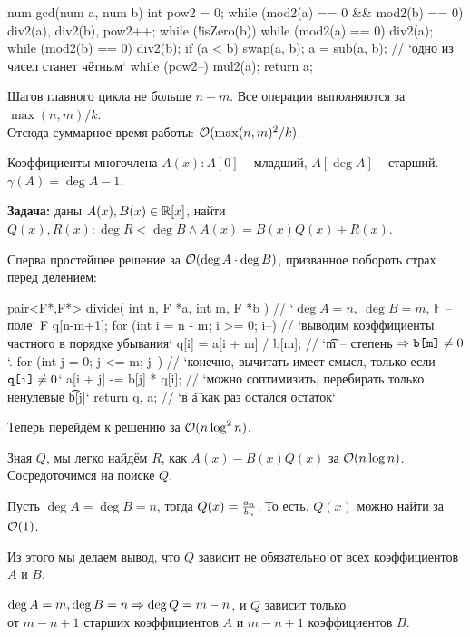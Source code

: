 \begin{code}
num gcd(num a, num b) {
	int pow2 = 0;
	while (mod2(a) == 0 && mod2(b) == 0)
		div2(a), div2(b), pow2++;
	while (!isZero(b)) { 
		while (mod2(a) == 0) div2(a);
		while (mod2(b) == 0) div2(b);
		if (a < b) swap(a, b);
		a = sub(a, b); // `одно из чисел станет чётным`
	}
	while (pow2--) mul2(a);
	return a;
}
\end{code}
Шагов главного цикла не больше $n{+}m$. Все операции выполняются за $\max(n,m)/k$.\\
Отсюда суммарное время работы: $\mathcal{O}(\max(n,m)^2/k)$.


Коэффициенты многочлена $A(x)\colon A[0]$ -- младший, $A[\deg A]$ -- старший. $\gamma(A) = \deg A - 1$.

\down
{\bf Задача:} даны $A(x), B(x) \in \mathbb{R}[x]$, найти $Q(x), R(x) \colon \deg R < \deg B \wedge A(x) = B(x)Q(x) + R(x)$.

\down
Сперва простейшее решение за $\mathcal{O}(\deg A \cdot \deg B)$, призванное побороть страх перед делением:
\begin{code}
pair<F*,F*> divide( int n, F *a, int m, F *b ) { // `$\deg A = n, \ \deg B = m$, $\mathbb{F}$ -- поле`
	F q[n-m+1];
	for (int i = n - m; i >= 0; i--) { // `выводим коэффициенты частного в порядке убывания`
		q[i] = a[i + m] / b[m]; // `\t{m} -- степень $\Rightarrow \texttt{b[m]} \not= 0$`.
		for (int j = 0; j <= m; j--) // `конечно, вычитать имеет смысл, только если $\texttt{q[i]} \not=0$`
			a[i + j] -= b[j] * q[i]; // `можно соптимизить, перебирать только ненулевые \t{b[j]}`
	}
	return {q, a}; // `в \t{a} как раз остался остаток`
}
\end{code}

Теперь перейдём к решению за $\mathcal{O}(n \log^2 n)$.

Зная $Q$, мы легко найдём $R$, как $A(x) - B(x)Q(x)$ за $\mathcal{O}(n \log n)$. Сосредоточимся на поиске $Q$.

Пусть $\deg A = \deg B = n$, тогда $Q(x) = {\textstyle\frac{a_n}{b_n}}$. То есть, $Q(x)$ можно найти за $\mathcal{O}(1)$. 

Из этого мы делаем вывод, что $Q$ зависит не обязательно от всех коэффициентов $A$ и $B$.

\begin{Lm}
$\deg A = m, \deg B = n \Rightarrow \deg Q = m - n$, и $Q$ зависит только \\
от $m{-}n{+}1$ старших коэффициентов $A$ и $m{-}n{+}1$ коэффициентов $B$.
\end{Lm}

